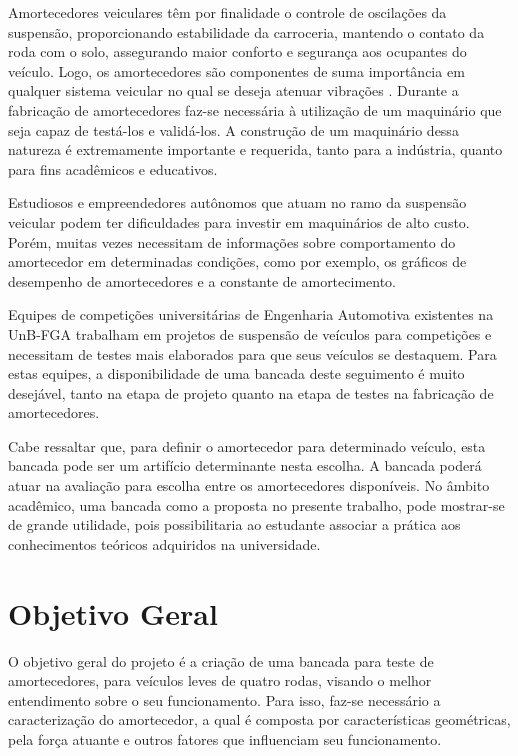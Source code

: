 		Amortecedores veiculares têm por finalidade o controle de oscilações da suspensão, proporcionando estabilidade da carroceria, mantendo o contato da roda com o solo, assegurando maior conforto e segurança aos ocupantes do veículo. Logo, os amortecedores são componentes de suma importância em qualquer sistema veicular no qual se deseja atenuar vibrações \cite{Duarte}. Durante a fabricação de amortecedores faz-se necessária à utilização de um maquinário que seja capaz de testá-los e validá-los. A construção de um maquinário dessa natureza é extremamente importante e requerida, tanto para a indústria, quanto para fins acadêmicos e educativos.

		Estudiosos e empreendedores autônomos que atuam no ramo da suspensão veicular podem ter dificuldades para investir em maquinários de alto custo. Porém, muitas vezes necessitam de informações sobre comportamento do amortecedor em determinadas condições, como por exemplo, os gráficos de desempenho de amortecedores e a constante de amortecimento.

		Equipes de competições universitárias de Engenharia Automotiva existentes na UnB-FGA trabalham em projetos de suspensão de veículos para competições e necessitam de testes mais elaborados para que seus veículos se destaquem. Para estas equipes, a disponibilidade de uma bancada deste seguimento é muito desejável, tanto na etapa de projeto quanto na etapa de testes na fabricação de amortecedores.

		Cabe ressaltar que, para definir o amortecedor para determinado veículo, esta bancada pode ser um artifício determinante nesta escolha. A bancada poderá atuar na avaliação para escolha entre os amortecedores disponíveis. No âmbito acadêmico, uma bancada como a proposta no presente trabalho, pode mostrar-se de grande utilidade, pois possibilitaria ao estudante associar a prática aos conhecimentos teóricos adquiridos na universidade.

	\section{Objetivo Geral}
	\label{sec:tap_objetivo_geral}

		O objetivo geral do projeto é a criação de uma bancada para teste de amortecedores, para veículos leves de quatro rodas, visando o melhor entendimento sobre o seu funcionamento. Para isso, faz-se necessário a caracterização do amortecedor, a qual é composta por características geométricas, pela força atuante e outros fatores que influenciam seu funcionamento.
			

